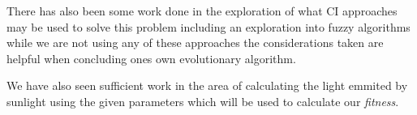 \documentclass{article}
\begin{document}
There has also been some work done in the exploration of what CI approaches may be used to solve this problem including an exploration into fuzzy algorithms while we are not using any of these approaches the considerations taken are helpful when concluding ones own evolutionary algorithm. \cite{kurian_aithal_bhat_george_2008}

We have also seen sufficient work in the area of calculating the light emmited by sunlight using the given parameters which will be used to calculate our \textit{fitness}. 

\printbibliography
\end{document}
